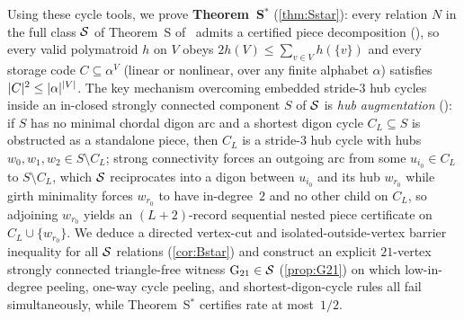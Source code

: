 Using these cycle tools, we prove \textbf{Theorem~S$^*$} (\cref{thm:Sstar}): every relation $N$ in the full class
$\mathcal{S}$ of Theorem~S of~\cite{FourthPaper2026} admits a certified piece decomposition (), so
every valid polymatroid $h$ on $V$ obeys $2 h(V) \le \sum_{v \in V} h(\{v\})$ and every
storage code $C \subseteq \alpha^V$ (linear or nonlinear, over any finite alphabet $\alpha$) satisfies
$\lvert C \rvert^2 \le \lvert \alpha \rvert^{\lvert V \rvert}$. The key mechanism overcoming embedded stride-$3$ hub cycles inside an
in-closed strongly connected component $S$ of $\mathcal{S}$ is \emph{hub augmentation}
(): if $S$ has no minimal chordal digon arc and a shortest digon cycle $C_L \subseteq S$
is obstructed as a standalone piece, then $C_L$ is a stride-$3$ hub cycle with hubs $w_0, w_1, w_2 \in S \setminus C_L$;
strong connectivity forces an outgoing arc from some $u_{i_0} \in C_L$ to $S \setminus C_L$, which $\mathcal{S}$ reciprocates
into a digon between $u_{i_0}$ and its hub $w_{r_0}$ while girth minimality forces $w_{r_0}$ to have in-degree~$2$ and no
other child on $C_L$, so adjoining $w_{r_0}$ yields an $(L+2)$-record sequential nested piece certificate on
$C_L \cup \{w_{r_0}\}$. We deduce a directed vertex-cut and isolated-outside-vertex barrier inequality for all $\mathcal{S}$
relations (\cref{cor:Bstar}) and construct an explicit $21$-vertex strongly connected triangle-free witness $\mathrm{G}_{21} \in \mathcal{S}$
(\cref{prop:G21}) on which low-in-degree peeling, one-way cycle peeling, and shortest-digon-cycle rules all fail
simultaneously, while Theorem~S$^*$ certifies rate at most~$1/2$.

